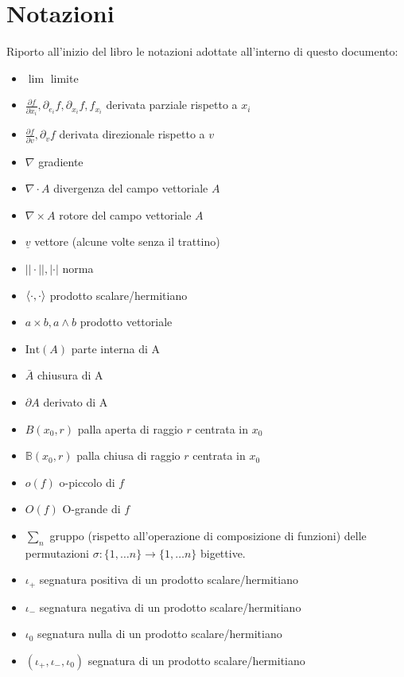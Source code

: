 \documentclass[openany, italian]{book}
\begin{document}
	\chapter*{Notazioni}
	Riporto all'inizio del libro le notazioni adottate all'interno di questo documento:
	\begin{itemize}[label=\hspace{-0.5em}]
		\item $\lim$ limite		
		\item $\frac{\partial f}{\partial x_i}, \partial_{e_i} f, \partial_{x_i} f, f_{x_i}$ derivata parziale rispetto a $x_i$
		\item $\frac{\partial f}{\partial v}, \partial_v f$ derivata direzionale rispetto a $v$
		\item $\nabla$ gradiente
		\item $\nabla \cdot A$ divergenza del campo vettoriale $A$
		\item $\nabla \times A$ rotore del campo vettoriale $A$
		\item $\underline{v}$ vettore (alcune volte senza il trattino)
		\item $||\cdot||, |\cdot|$ norma
		\item $\langle \cdot, \cdot \rangle$ prodotto scalare/hermitiano
		\item $a \times b, a \wedge b$ prodotto vettoriale
		\item $\text{Int}(A)$ parte interna di A
		\item $\bar{A}$ chiusura di A
		\item $\partial A$ derivato di A
		\item $B(x_0, r)$ palla aperta di raggio $r$ centrata in $x_0$
		\item $\mathbb{B}(x_0, r)$ palla chiusa di raggio $r$ centrata in $x_0$
		\item $o(f)$ o-piccolo di $f$
		\item $O(f)$ O-grande di $f$
		\item $\sum_{n}$ gruppo (rispetto all'operazione di composizione di funzioni) delle permutazioni $\sigma: \{1, \ldots n \} \to \{1, \ldots n \}$ bigettive.
		\item $\iota_+$ segnatura positiva di un prodotto scalare/hermitiano
		\item $\iota_-$ segnatura negativa di un prodotto scalare/hermitiano
		\item $\iota_0$ segnatura nulla di un prodotto scalare/hermitiano
		\item $(\iota_+, \iota_-, \iota_0)$ segnatura di un prodotto scalare/hermitiano
	\end{itemize}
\end{document}
